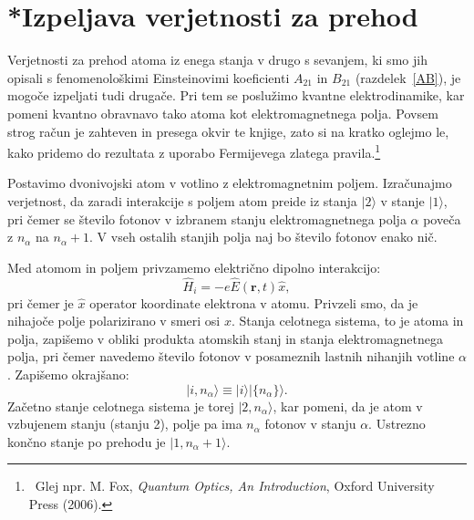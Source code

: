 \section{*Izpeljava verjetnosti za prehod}
\label{chap:verjetnost}
Verjetnosti za prehod atoma iz enega stanja v drugo s sevanjem, ki
smo jih opisali s fenomenološkimi Einsteinovimi koeficienti $A_{21}$
in $B_{21}$ (razdelek~\ref{AB}), 
je mogoče izpeljati tudi drugače.
Pri tem se poslužimo kvantne elektrodinamike, 
kar pomeni kvantno obravnavo 
tako atoma kot elektromagnetnega polja. Povsem strog račun je zahteven in presega
okvir te knjige, zato si na kratko oglejmo le, kako pridemo do rezultata z uporabo
Fermijevega zlatega pravila.\footnote{~Glej npr. M. 
Fox, {\it Quantum Optics, An Introduction}, Oxford University Press (2006).}

Postavimo dvonivojski atom v votlino z elektromagnetnim poljem.
Izračunajmo verjetnost, da zaradi interakcije s poljem atom
preide iz stanja $|2\rangle$ v stanje $|1\rangle$, pri čemer se
število fotonov v izbranem stanju elektromagnetnega polja $\alpha$
poveča z $n_{\alpha}$ na $n_{\alpha}+1$. V vseh ostalih stanjih
polja naj bo število fotonov enako nič.

Med atomom in poljem privzamemo električno dipolno interakcijo:
\begin{equation}
\hat{H}_{i}=-e\hat{E}(\mathbf{r},t)\hat{x},
\label{4.47}
\end{equation}
pri čemer je $\hat{x}$ operator koordinate elektrona v atomu. 
Privzeli
smo, da je nihajoče polje polarizirano v smeri osi $x$. Stanja celotnega sistema, 
to je atoma in polja, zapišemo v obliki produkta atomskih stanj in
stanja elektromagnetnega polja, pri čemer navedemo število fotonov
v posameznih lastnih nihanjih votline $\alpha$. Zapišemo okrajšano:
\begin{equation}
|i,n_{\alpha}\rangle\equiv|i\rangle|\{n_{\alpha}\}\rangle.
\label{4.48}
\end{equation}
Začetno stanje celotnega sistema je torej $|2,n_{\alpha}\rangle$, kar pomeni, da je
atom v vzbujenem stanju (stanju 2), polje pa ima $n_{\alpha}$ fotonov v stanju $\alpha$.
Ustrezno končno stanje po prehodu je $|1,n_{\alpha}+1\rangle$.

